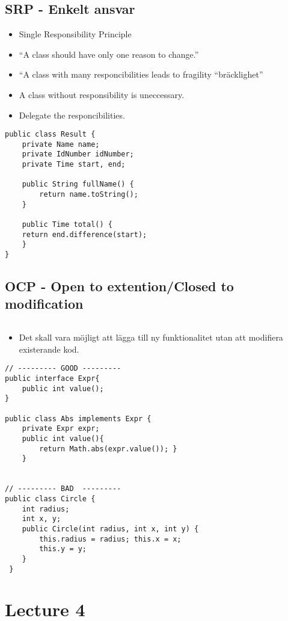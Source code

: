 \documentclass[11pt]{amsart}
\begin{document}
\subsection{SRP - Enkelt ansvar}

\begin{itemize}
  \item Single Responsibility Principle
  \item ``A class should have only one reason to change.''
  \item ``A class with many responcibilities leads to fragility ``bräcklighet''
  \item A class without responsibility is uneccessary. 
  \item Delegate the responcibilities.
\end{itemize}

\begin{lstlisting}
public class Result {
	private Name name;
	private IdNumber idNumber; 
	private Time start, end;
	 
	public String fullName() {
		return name.toString(); 
	}
	
	public Time total() {
	return end.difference(start);
	}
}
\end{lstlisting}

\subsection{OCP - Open to extention/Closed to modification}
$ $
\begin{itemize}
  \item Det skall vara möjligt att lägga till ny funktionalitet utan att
  modifiera existerande kod.
\end{itemize}
\begin{lstlisting}
// --------- GOOD ---------
public interface Expr{
	public int value();
}

public class Abs implements Expr { 
	private Expr expr;
	public int value(){
  		return Math.abs(expr.value()); }
	}


// --------- BAD  ---------
public class Circle { 
	int radius;
	int x, y;
	public Circle(int radius, int x, int y) {
		this.radius = radius; this.x = x;
		this.y = y;
	}
 }
\end{lstlisting}

\section{Lecture 4}
\end{document}

